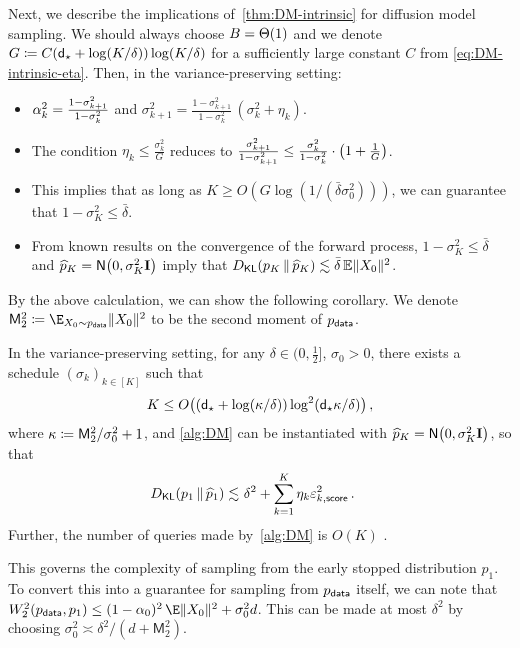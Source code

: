 Next, we describe the implications of~\cref{thm:DM-intrinsic} for diffusion model sampling.
We should always choose $\B=\Theta(1)$ %
and we denote $G\deq C(\dstar+\log(K/\delta))\log(K/\delta)$ for a sufficiently large constant $C$ from \cref{eq:DM-intrinsic-eta}.
Then, in the variance-preserving setting:%
\begin{itemize}
    \item {} $\alp_k^2=\frac{1-\sigma_{k+1}^2}{1-\sigma_k^2}$ and $\sigma_{k+1}^2=\frac{1-\sigma_{k+1}^2}{1-\sigma_k^2}\,(\sigma_k^2+\eta_k)$.
    \item The condition $\eta_k\leq \frac{\sigma_k^2}{G}$ reduces to $\frac{\sigma_{k+1}^2}{1-\sigma_{k+1}^2}\leq \frac{\sigma_k^2}{1-\sigma_k^2}\cdot \prn*{1+\frac{1}{G}}$. 
    \item This implies that as long as $K\geq O(G\log(1/(\bar\delta \sigma_0^2)))$, we can guarantee that $1-\sigma_K^2\leq \bar\delta$.
    \item From known results on the convergence of the forward process, $1-\sigma_K^2 \le \bar\delta$ and $\phat_K=\normal{0,\sigma_K^2\Id}$ imply that $\kl{p_K}{\phat_K}\lesssim \bar\delta \En\nrm{X_0}^2$.
\end{itemize}
By the above calculation, we can show the following corollary. We denote $\mathsf M_2^2 \deq \E_{X_0\sim \pdata}\|X_0\|^2$ to be the second moment of $\pdata$.

\begin{corollary}\label{cor:poly-log}
In the variance-preserving setting, for any $\delta\in(0,\frac12]$, $\sigma_0>0$, there exists a schedule $(\sigma_k)_{k\in [K]}$ such that
\begin{align*}
    K\leq O\prn[\big]{(\dstar+\log(\kappa/\delta))\log^2(\dstar\kappa/\delta)}\,,
\end{align*}
where $\kappa\deq \mathsf M_2^2/\sigma_0^2+ 1$, 
and \cref{alg:DM} can be instantiated with $\phat_K=\normal{0,\sigma_K^2\Id}$, so that
\begin{align*}
    \kl{p_1}{\phat_1}\leqsim&~ \delta^2+\sum_{k=1}^{K} \eta_k \epssct^2\,.
\end{align*}
Further, the number of queries made by~\cref{alg:DM} is $O(K)$ \whp.
\end{corollary}

This governs the complexity of sampling from the early stopped distribution $p_1$.
    To convert this into a guarantee for sampling from $\pdata$ itself, we can note that $W_2^2(\pdata, p_1)\le (1-\alpha_0)^2\,\E\|X_0\|^2 + \sigma_0^2 d$.
    This can be made at most $\delta^2$ by choosing $\sigma_0^2 \asymp \delta^2/(d+\mathsf M_2^2)$.

